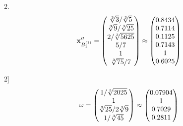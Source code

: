 \documentclass[10pt,a4paper]{article}
\begin{document}
	2.
	\[
		\bold{x}''_{B_1^{(1)}} = 
		\begin{pmatrix}
			{\sqrt[3]{3}} / {\sqrt[3]{5}} \\
			{\sqrt[3]{9}} / {\sqrt[3]{25}} \\
			{{2}} / {\sqrt[3]{5625}} \\
			{{5}} / {{7}} \\
			{1}{} \\
			{\sqrt[3]{75}} / {{7}} \\
		\end{pmatrix}
		\approx
		\begin{pmatrix}
			0.8434   \\
			0.7114   \\
			0.1125   \\
			0.7143   \\
			1        \\
			0.6025   \\
		\end{pmatrix}
	\]

	2]
	\[
		\bold{\omega} = 
		\begin{pmatrix}
			{1} / {\sqrt[3]{2025}} \\
			{1}{} \\
			{\sqrt[3]{25}} / {{2}\sqrt[3]{9}} \\
			{1} / {\sqrt[3]{45}} \\
		\end{pmatrix}
		\approx
		\begin{pmatrix}
			0.07904  \\
			1        \\
			0.7029   \\
			0.2811   \\
		\end{pmatrix}
	\]
\end{document}
